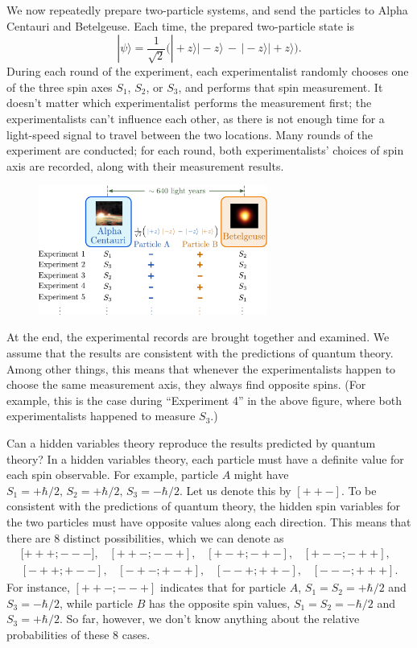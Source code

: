 \documentclass[pra,12pt]{revtex4}
\begin{document}
We now repeatedly prepare two-particle systems, and send the particles
to Alpha Centauri and Betelgeuse.  Each time, the prepared
two-particle state is
$$|\psi\rangle = \frac{1}{\sqrt{2}} \Big(|\!+\!z\rangle|\!-\!z\rangle \,-\, |\!-\!z\rangle|\!+\!z\rangle\Big).$$
During each round of the experiment, each experimentalist randomly
chooses one of the three spin axes $S_1$, $S_2$, or $S_3$, and
performs that spin measurement.  It doesn't matter which
experimentalist performs the measurement first; the experimentalists
can't influence each other, as there is not enough time for a
light-speed signal to travel between the two locations.  Many rounds
of the experiment are conducted; for each round, both
experimentalists' choices of spin axis are recorded, along with their
measurement results.

\begin{figure}[h]
  \centering\includegraphics[width=0.67\textwidth]{bell}
\end{figure}

At the end, the experimental records are brought together and
examined.  We assume that the results are consistent with the
predictions of quantum theory.  Among other things, this means that
whenever the experimentalists happen to choose the same measurement
axis, they always find opposite spins.  (For example, this is the case
during ``Experiment 4'' in the above figure, where both
experimentalists happened to measure $S_3$.)

Can a hidden variables theory reproduce the results predicted by
quantum theory?  In a hidden variables theory, each particle must have
a definite value for each spin observable.  For example, particle $A$
might have $S_1 = +\hbar/2, \, S_2 = +\hbar/2, \, S_3 = -\hbar/2$.
Let us denote this by $[++-]$.  To be consistent with the predictions
of quantum theory, the hidden spin variables for the two particles
must have opposite values along each direction.  This means that there
are $8$ distinct possibilities, which we can denote as
$$\begin{aligned}{[}{+++};{---}], \;\;\; [{++-};{--+}], \;\;\; [{+-+};{-+-}], \;\;\; [{+--};{-++}],\\ [{-++};{+--}], \;\;\; [{-+-};{+-+}], \;\;\; [{--+};{++-}], \;\;\; [{---};{+++}].\end{aligned}$$
For instance, $[{++-};{--+}]$ indicates that for particle $A$, $S_1 =
S_2 = +\hbar/2$ and $S_3 = -\hbar/2$, while particle $B$ has the
opposite spin values, $S_1 = S_2 = -\hbar/2$ and $S_3 = +\hbar/2$.
So far, however, we don't know anything about the relative
probabilities of these 8 cases.
\end{document}
